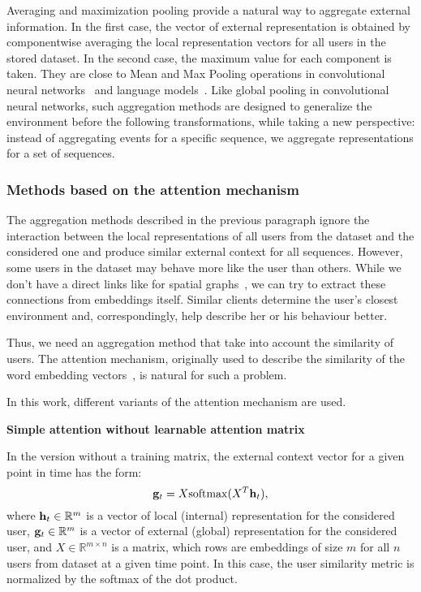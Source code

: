 Averaging and maximization pooling provide a natural way to aggregate external information. 
In the first case, the vector of external representation is obtained by componentwise averaging the local representation vectors for all users in the stored dataset.
In the second case, the maximum value for each component is taken. 
They are close to Mean and Max Pooling operations in convolutional neural networks~\cite{boureau2010theoretical} and language models~\cite{xing2024comparative}. Like global pooling in convolutional neural networks, such aggregation methods are designed to generalize the environment before the following transformations, while taking a new perspective: instead of aggregating events for a specific sequence, we aggregate representations for a set of sequences.

\subsubsection{Methods based on the attention mechanism}

The aggregation methods described in the previous paragraph ignore the interaction between the local representations of all users from the dataset and the considered one and produce similar external context for all sequences.
However, some users in the dataset may behave more like the user than others. 
While we don't have a direct links like for spatial graphs~\cite{huang2024temporal},
we can try to extract these connections from embeddings itself.
Similar clients determine the user’s closest environment and, correspondingly, help describe her or his behaviour better.

Thus, we need an aggregation method that take into account the similarity of users. 
The attention mechanism, originally used to describe the similarity of the word embedding vectors~\cite{vaswani2017attention}, is natural for such a problem.

In this work, different variants of the attention mechanism are used.

\textbf{Simple attention without learnable attention matrix}

In the version without a training matrix, the external context vector for a given point in time has the form:
\begin{equation}
     \mathbf{g}_t = X \mathrm{softmax} (X^T \mathbf{h}_t),
\end{equation}
where $\mathbf{h}_t \in \mathbb{R}^m$ is a vector of local (internal) representation for the considered user, $\mathbf{g}_t \in \mathbb{R}^{m}$ is a vector of external (global) representation for the considered user, and $X \in \mathbb{R}^{m \times n}$ is a matrix, which rows are embeddings of size $m$ for all $n$ users from dataset at a given time point.
In this case, the user similarity metric is normalized by the softmax of the dot product.

